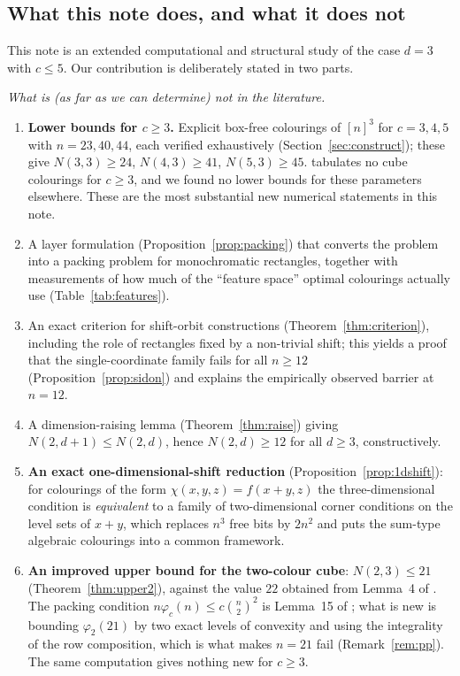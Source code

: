 \documentclass[11pt]{article}
\theoremstyle{definition}
\begin{document}
\subsection{What this note does, and what it does not}
This note is an extended computational and structural study of the case $d=3$ with
$c\le 5$. Our contribution is deliberately stated in two parts.

\emph{What is (as far as we can determine) not in the literature.}
\begin{enumerate}[label=(\roman*)]
\item \textbf{Lower bounds for $c\ge3$.} Explicit box-free colourings of $[n]^3$ for
  $c=3,4,5$ with $n=23,40,44$, each verified exhaustively
  (Section~\ref{sec:construct}); these give $N(3,3)\ge 24$, $N(4,3)\ge41$,
  $N(5,3)\ge45$. \cite{CFP} tabulates no cube colourings for $c\ge3$, and we found no
  lower bounds for these parameters elsewhere. These are the most substantial new
  numerical statements in this note.
\item A layer formulation (Proposition~\ref{prop:packing}) that converts the problem into
  a packing problem for monochromatic rectangles, together with measurements of how much
  of the ``feature space'' optimal colourings actually use (Table~\ref{tab:features}).
\item An exact criterion for shift-orbit constructions (Theorem~\ref{thm:criterion}),
  including the role of rectangles fixed by a non-trivial shift; this yields a proof that
  the single-coordinate family fails for all $n\ge12$ (Proposition~\ref{prop:sidon}) and
  explains the empirically observed barrier at $n=12$.
\item A dimension-raising lemma (Theorem~\ref{thm:raise}) giving
  $N(2,d+1)\le N(2,d)$, hence $N(2,d)\ge 12$ for all $d\ge3$, constructively.
\item \textbf{An exact one-dimensional-shift reduction} (Proposition~\ref{prop:1dshift}):
  for colourings of the form $\chi(x,y,z)=f(x+y,z)$ the three-dimensional condition is
  \emph{equivalent} to a family of two-dimensional corner conditions on the level sets of
  $x+y$, which replaces $n^3$ free bits by $2n^2$ and puts the sum-type algebraic
  colourings into a common framework.
\item \textbf{An improved upper bound for the two-colour cube}: $N(2,3)\le21$
  (Theorem~\ref{thm:upper2}), against the value $22$ obtained from Lemma~4 of
  \cite{CFP}. The packing condition $n\varphi_c(n)\le c\binom{n}{2}^2$ is Lemma~15 of
  \cite{CFP}; what is new is bounding $\varphi_2(21)$ by two exact levels of convexity
  and using the integrality of the row composition, which is what makes $n=21$ fail
  (Remark~\ref{rem:pp}). The same computation gives nothing new for $c\ge3$.
\end{enumerate}
\end{document}
